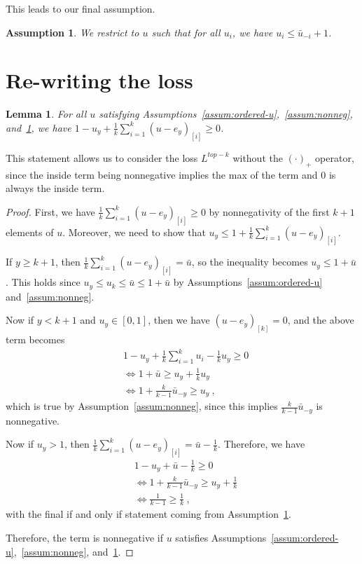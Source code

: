 \documentclass[12pt]{article}
\newtheorem{lemma}{Lemma}
\newtheorem{assumption}{Assumption}
\begin{document}
This leads to our final assumption.
\begin{assumption}\label{assum:top-threshold}
	We restrict to $u$ such that for all $u_i$, we have $u_i \leq \bar u_{-i} +1$.
\end{assumption}

\section{Re-writing the loss}


\begin{lemma}\label{lem:get-rid-max-op}
	For all $u$ satisfying Assumptions~\ref{assum:ordered-u},~\ref{assum:nonneg}, and~\ref{assum:top-threshold}, we have $1 -u_y + \frac{1}{k} \sum_{i=1}^k (u - e_y)_{[i]} \geq 0$.
\end{lemma}
This statement allows us to consider the loss $L^{top-k}$ without the $(\cdot)_+$ operator, since the inside term being nonnegative implies the max of the term and $0$ is always the inside term.
\begin{proof}
	First, we have $\frac 1 k \sum_{i=1}^k (u-e_y)_{[i]} \geq 0$ by nonnegativity of the first $k+1$ elements of $u$.
	Moreover, we need to show that $u_y \leq 1 + \frac 1 k \sum_{i=1}^k (u-e_y)_{[i]}$.
	
	If $y \geq k+1$, then $\frac 1 k \sum_{i=1}^k (u-e_y)_{[i]} = \bar u$, so the inequality becomes $u_y \leq 1 + \bar u$.
	This holds since $u_y \leq u_k \leq \bar u \leq 1 + \bar u$ by Assumptions~\ref{assum:ordered-u} and~\ref{assum:nonneg}.
	
	Now if $y < k+1$ and $u_y \in [0,1]$, then we have $(u-e_y)_{[k]} = 0$, and the above term becomes
	\begin{align*}
	&1 -u_y + \frac{1}{k} \sum_{i=1}^{k} u_i - \frac 1 k u_y \geq 0\\
	&\iff 1 + \bar u \geq u_y + \frac{1}{k} u_y\\
	&\iff 1 + \frac k {k-1} \bar u_{-y} \geq u_y~,~
	\end{align*}
	which is true by Assumption~\ref{assum:nonneg}, since this implies $\frac{k}{k-1} \bar u_{-y}$ is nonnegative.
	
	Now if $u_y > 1$, then $\frac 1 k \sum_{i=1}^k (u-e_y)_{[i]} = \bar u - \frac 1 k$.
	Therefore, we have 
	\begin{align*}
	&1 -u_y + \bar u - \frac 1 k \geq 0\\
	&\iff 1 + \frac{k}{k-1}\bar u_{-y} \geq u_y + \frac 1 k\\
	&\iff \frac{1}{k-1} \geq \frac 1 k~,~
	\end{align*}
	with the final if and only if statement coming from Assumption~\ref{assum:top-threshold}.
	
	Therefore, the term is nonnegative if $u$ satisfies Assumptions~\ref{assum:ordered-u},~\ref{assum:nonneg}, and~\ref{assum:top-threshold}.
\end{proof}
\end{document}
